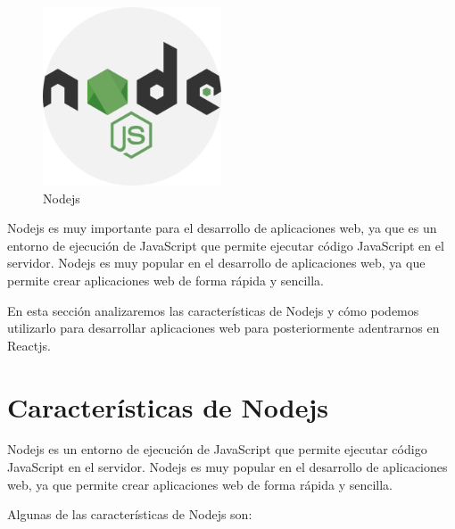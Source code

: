 \documentclass[
  a4paper,
  DIV=11,
  numbers=noendperiod,
  onepage,
  openany]{scrreprt}
\begin{document}
\begin{figure}[H]

{\centering \includegraphics[width=2.08333in,height=\textheight]{images/node-logo.png}

}

\caption{Nodejs}

\end{figure}%

Nodejs es muy importante para el desarrollo de aplicaciones web, ya que
es un entorno de ejecución de JavaScript que permite ejecutar código
JavaScript en el servidor. Nodejs es muy popular en el desarrollo de
aplicaciones web, ya que permite crear aplicaciones web de forma rápida
y sencilla.

En esta sección analizaremos las características de Nodejs y cómo
podemos utilizarlo para desarrollar aplicaciones web para posteriormente
adentrarnos en Reactjs.

\section{Características de Nodejs}\label{caracteruxedsticas-de-nodejs}

Nodejs es un entorno de ejecución de JavaScript que permite ejecutar
código JavaScript en el servidor. Nodejs es muy popular en el desarrollo
de aplicaciones web, ya que permite crear aplicaciones web de forma
rápida y sencilla.

Algunas de las características de Nodejs son:
\end{document}
